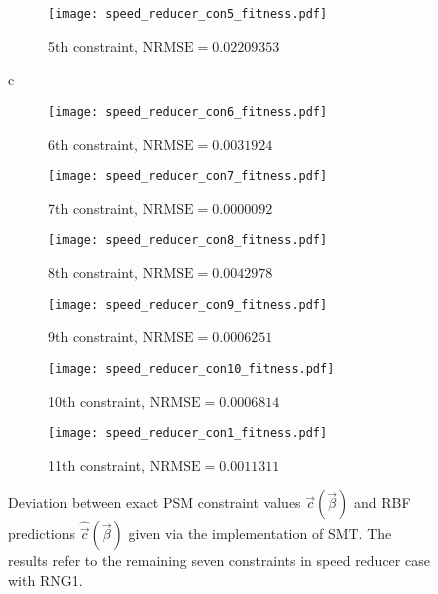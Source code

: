 \newpage


\begin{figure}[h!]
\centering
    \begin{subfigure}[b]{0.45\textwidth}
    \centering
    \caption{5th constraint, $\mathrm{NRMSE} \!= \!0.02209353$}
    \texttt{[image: speed\_reducer\_con5\_fitness.pdf]}    
    \end{subfigure}c
    \hfill
    \begin{subfigure}[b]{0.45\textwidth}
    \centering
    \caption{6th constraint, $\mathrm{NRMSE} \!= \!0.0031924$}
    \texttt{[image: speed\_reducer\_con6\_fitness.pdf]}    
    \end{subfigure}
    \hfill
    \begin{subfigure}[b]{0.45\textwidth}
    \centering
    \caption{7th constraint, $\mathrm{NRMSE} \!= \!0.0000092$}
    \texttt{[image: speed\_reducer\_con7\_fitness.pdf]}    
    \end{subfigure}
    \hfill
    \begin{subfigure}[b]{0.45\textwidth}
    \centering
    \caption{8th constraint, $\mathrm{NRMSE} \!= \!0.0042978$}
    \texttt{[image: speed\_reducer\_con8\_fitness.pdf]}    
    \end{subfigure}
    \hfill
    \begin{subfigure}[b]{0.45\textwidth}
    \centering
    \caption{9th constraint, $\mathrm{NRMSE} \!= \!0.0006251$}
    \texttt{[image: speed\_reducer\_con9\_fitness.pdf]}    
    \end{subfigure}
    \hfill
    \begin{subfigure}[b]{0.45\textwidth}
    \centering
    \caption{10th constraint, $\mathrm{NRMSE} \!= \!0.0006814$}
    \texttt{[image: speed\_reducer\_con10\_fitness.pdf]}    
    \end{subfigure}
    \hfill
    \begin{subfigure}[b]{0.45\textwidth}
    \centering
    \caption{11th constraint, $\mathrm{NRMSE} \!= \!0.0011311$}
    \texttt{[image: speed\_reducer\_con1\_fitness.pdf]}    
    \end{subfigure}
\caption{Deviation between exact PSM constraint values $\vec{c}
(\vec{β})$ and RBF predictions $\hat{\vec{c}}(\vec{β})$ given via 
the implementation of SMT. The results refer to the remaining 
seven constraints in speed reducer case with RNG1.}
\label{fig:fitting_c5_11_speed_reducer}
\end{figure}

